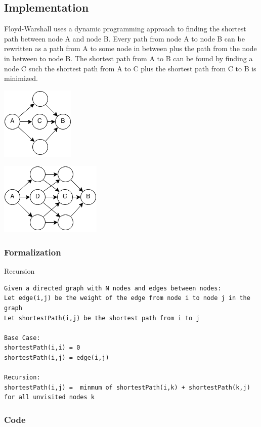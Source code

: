 \documentclass[11pt,oneside]{book}
\makeatletter
\def\maxwidth#1{\ifdim\Gin@nat@width>#1 #1\else\Gin@nat@width\fi}
\makeatother
\begin{document}
\subsection{Implementation}

Floyd-Warshall uses a dynamic programming approach to finding the shortest path between node A and node B. Every path from node A to node B can be rewritten as a path from A to some node in between plus the path from the node in between to node B. The shortest path from A to B can be found by finding a node C such the shortest path from A to C plus the shortest path from C to B is minimized.

\includegraphics[width=\maxwidth{\textwidth}]{floydwarshall1.png}

\includegraphics[width=\maxwidth{\textwidth}]{floydwarshall.png}

\subsubsection{Formalization}

Recursion

\begin{lstlisting}
Given a directed graph with N nodes and edges between nodes:
Let edge(i,j) be the weight of the edge from node i to node j in the graph
Let shortestPath(i,j) be the shortest path from i to j

Base Case:
shortestPath(i,i) = 0
shortestPath(i,j) = edge(i,j)

Recursion:
shortestPath(i,j) =  minmum of shortestPath(i,k) + shortestPath(k,j) for all unvisited nodes k
\end{lstlisting}

\subsubsection{Code}
\end{document}
